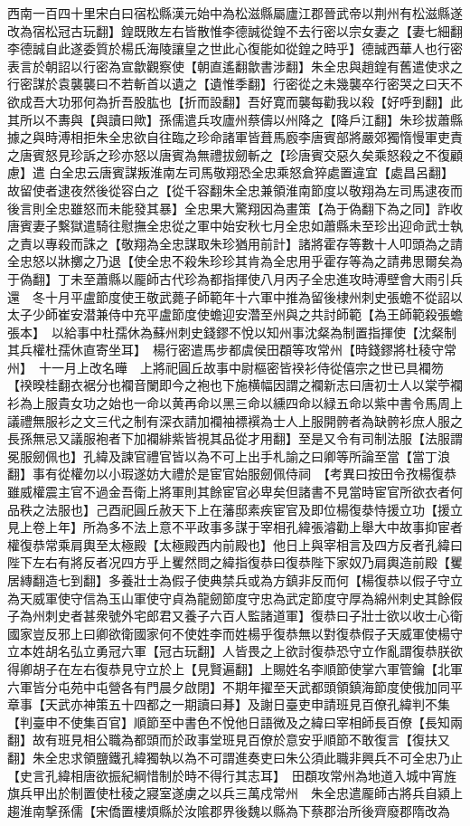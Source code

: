 西南一百四十里宋白曰宿松縣漢元始中為松滋縣屬廬江郡晉武帝以荆州有松滋縣遂改為宿松冠古玩翻】鍠既敗左右皆散惟李德誠從鍠不去行密以宗女妻之【妻七細翻李德誠自此遂委質於楊氏海陵讓皇之世此心復能如從鍠之時乎】德誠西華人也行密表言於朝詔以行密為宣歙觀察使【朝直遙翻歙書涉翻】朱全忠與趙鍠有舊遣使求之行密謀於袁襲襲曰不若斬首以遺之【遺惟季翻】行密從之未幾襲卒行密哭之曰天不欲成吾大功邪何為折吾股肱也【折而設翻】吾好寛而襲每勸我以殺【好呼到翻】此其所以不夀與【與讀曰歟】孫儒遣兵攻廬州蔡儔以州降之【降戶江翻】朱珍拔蕭縣據之與時溥相拒朱全忠欲自往臨之珍命諸軍皆葺馬廏李唐賓部將嚴郊獨惰慢軍吏責之唐賓怒見珍訴之珍亦怒以唐賓為無禮拔劒斬之【珍唐賓交惡久矣乘怒殺之不復顧慮】遣白全忠云唐賓謀叛淮南左司馬敬翔恐全忠乘怒倉猝處置違宜【處昌呂翻】故留使者逮夜然後從容白之【從千容翻朱全忠兼領淮南節度以敬翔為左司馬逮夜而後言則全忠雖怒而未能發其暴】全忠果大驚翔因為畫策【為于偽翻下為之同】詐收唐賓妻子繫獄遣騎往慰撫全忠從之軍中始安秋七月全忠如蕭縣未至珍出迎命武士執之責以專殺而誅之【敬翔為全忠謀取朱珍猶用前計】諸將霍存等數十人叩頭為之請全忠怒以牀擲之乃退【使全忠不殺朱珍珍其肯為全忠用乎霍存等為之請弗思爾矣為于偽翻】丁未至蕭縣以龎師古代珍為都指揮使八月丙子全忠進攻時溥壁會大雨引兵還　冬十月平盧節度使王敬武薨子師範年十六軍中推為留後棣州刺史張蟾不從詔以太子少師崔安潜兼侍中充平盧節度使蟾迎安濳至州與之共討師範【為王師範殺張蟾張本】　以給事中杜孺休為蘇州刺史錢鏐不悅以知州事沈粲為制置指揮使【沈粲制其兵權杜孺休直寄坐耳】　楊行密遣馬步都虞侯田頵等攻常州【時錢鏐將杜稜守常州】　十一月上改名曄　上將祀圓丘故事中尉樞密皆䙆衫侍從僖宗之世已具襴笏【䙆暌桂翻衣裾分也襴音闌即今之袍也下施横幅因謂之襴新志曰唐初士人以棠苧襴衫為上服貴女功之始也一命以黄再命以黑三命以纁四命以緑五命以紫中書令馬周上議禮無服衫之文三代之制有深衣請加襴袖褾襈為士人上服開骻者為缺骻衫庶人服之長孫無忌又議服袍者下加襴緋紫皆視其品從才用翻】至是又令有司制法服【法服謂冕服劒佩也】孔緯及諫官禮官皆以為不可上出手札諭之曰卿等所論至當【當丁浪翻】事有從權勿以小瑕遂妨大禮於是宦官始服劒佩侍祠　【考異曰按田令孜楊復恭雖威權震主官不過金吾衛上將軍則其餘宦官必卑矣但諸書不見當時宦官所欲衣者何品秩之法服也】己酉祀圓丘赦天下上在藩邸素疾宦官及即位楊復㳟恃援立功【援立見上卷上年】所為多不法上意不平政事多謀于宰相孔緯張濬勸上舉大中故事抑宦者權復恭常乘肩輿至太極殿【太極殿西内前殿也】他日上與宰相言及四方反者孔緯曰陛下左右有將反者况四方乎上矍然問之緯指復恭曰復恭陛下家奴乃肩輿造前殿【矍居縳翻造七到翻】多養壯士為假子使典禁兵或為方鎮非反而何【楊復恭以假子守立為天威軍使守信為玉山軍使守貞為龍劒節度守忠為武定節度守厚為綿州刺史其餘假子為州刺史者甚衆號外宅郎君又養子六百人監諸道軍】復恭曰子壯士欲以收士心衛國家豈反邪上曰卿欲衛國家何不使姓李而姓楊乎復恭無以對復恭假子天威軍使楊守立本姓胡名弘立勇冠六軍【冠古玩翻】人皆畏之上欲討復恭恐守立作亂謂復恭朕欲得卿胡子在左右復恭見守立於上【見賢遍翻】上賜姓名李順節使掌六軍管鑰【北軍六軍皆分屯苑中屯營各有門晨夕啟閉】不期年擢至天武都頭領鎮海節度使俄加同平章事【天武亦神策五十四都之一期讀曰朞】及謝日臺吏申請班見百僚孔緯判不集【判臺申不使集百官】順節至中書色不悅他日語微及之緯曰宰相師長百僚【長知兩翻】故有班見相公職為都頭而於政事堂班見百僚於意安乎順節不敢復言【復扶又翻】朱全忠求領鹽鐵孔緯獨執以為不可謂進奏吏曰朱公須此職非興兵不可全忠乃止【史言孔緯相唐欲振紀綱惜制於時不得行其志耳】　田頵攻常州為地道入城中宵旌旗兵甲出於制置使杜稜之寢室遂虜之以兵三萬戍常州　朱全忠遣龎師古將兵自潁上趨淮南撃孫儒【宋僑置樓煩縣於汝隂郡界後魏以縣為下蔡郡治所後齊廢郡隋改為